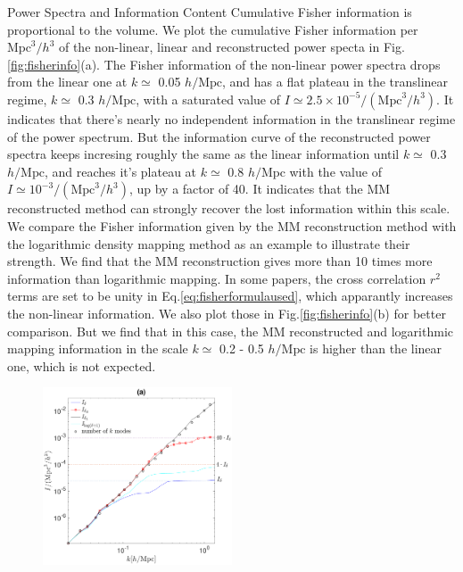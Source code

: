 \begin{section}{Power Spectra and Information Content}
  Cumulative Fisher information is proportional to the volume. We plot the 
cumulative Fisher information per $\mathrm{Mpc}^3/h^3$ of the non-linear, linear and reconstructed power specta in 
Fig.\ref{fig:fisherinfo}(a). The Fisher information of the non-linear power spectra drops 
from the linear one at $k \simeq$ 0.05 $h/\mathrm{Mpc}$, and has a flat plateau in the translinear regime, 
$k\simeq$ 0.3 $h/\mathrm{Mpc}$, with 
a saturated value of $I \simeq 2.5 \times 10^{-5}/(\mathrm{Mpc}^3/h^3)$. It 
indicates that there's nearly no independent information in the translinear regime of the power 
spectrum.
But the information curve of 
the reconstructed power spectra keeps incresing roughly the same as 
the linear information until $k\simeq$ 0.3 $h/\mathrm{Mpc}$, and reaches it's plateau at $k\simeq$ 0.8 $h/\mathrm{Mpc}$ with the 
value of $I \simeq  10^{-3}/(\mathrm{Mpc}^3/h^3)$, up by a factor of  40. 
It indicates that the MM reconstructed method can strongly recover the lost information 
within this scale. We compare the Fisher information given by the MM reconstruction method with 
the logarithmic density mapping method \cite{bib:Mark2009} as an example to illustrate their strength. 
We find that the MM reconstruction gives more than 10 times more information than logarithmic mapping. 
In some papers, the cross correlation $r^2$ terms are set to be unity in Eq.\ref{eq:fisherformulaused}, which 
apparantly increases the non-linear information. We also plot those in Fig.\ref{fig:fisherinfo}(b) 
for better comparison. But we find that in this case, the MM reconstructed and logarithmic mapping information in the scale 
$k \simeq$ 0.2 - 0.5 $h/\mathrm{Mpc}$ is higher than the linear one, which is not expected. 
\begin{figure}
  \includegraphics[width=0.5\textwidth]{fisher_r2_best_analysis-crop.pdf}

\end{figure}
\end{section}
